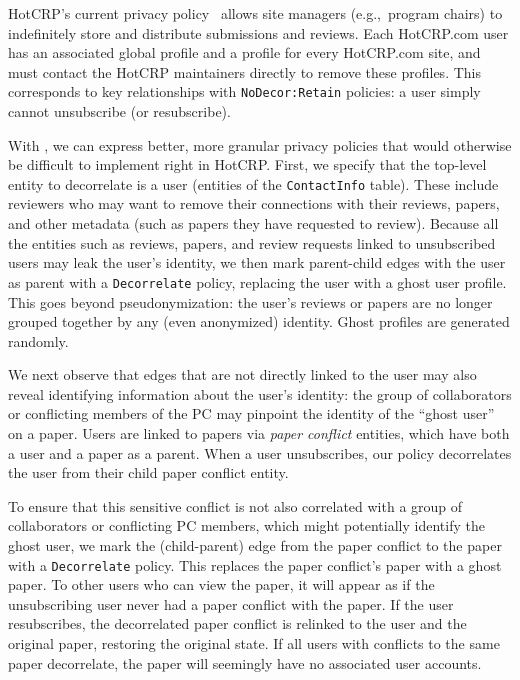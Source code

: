 HotCRP's current privacy policy~\cite{hotcrp:privacy} allows site managers (e.g.,\ program chairs)
to indefinitely store and distribute submissions and reviews. Each HotCRP.com user has an associated
global profile and a profile for every HotCRP.com site, and must contact the HotCRP maintainers
directly to remove these profiles. This corresponds to key relationships with
\texttt{NoDecor:Retain} policies: a user simply cannot unsubscribe (or resubscribe).

With \sys, we can express better, more granular privacy policies that would otherwise be difficult to
implement right in HotCRP. First, we specify that the top-level entity to decorrelate is a user
(entities of the \texttt{ContactInfo} table). These include reviewers who may want
to remove their connections with their reviews, papers, and other metadata (such as papers they
have requested to review).
Because all the entities such as reviews, papers, and review requests linked to unsubscribed users
may leak the user's identity, we then mark parent-child edges with the user as parent with a
\texttt{Decorrelate} policy, replacing the user with a ghost user profile. This goes beyond
pseudonymization: the user's reviews or papers are no longer grouped together by any (even anonymized)
identity. Ghost profiles are generated randomly.

We next observe that edges that are not directly linked to the user may also reveal identifying
information about the user's identity: the group of collaborators or conflicting members of the PC
may pinpoint the identity of the ``ghost user'' on a paper. Users are linked to papers via
\emph{paper conflict} entities, which have both a user and a paper as a parent. When a user
unsubscribes, our policy decorrelates the user from their child paper conflict entity. 

To ensure that this sensitive conflict is not also correlated with a group of collaborators or conflicting PC
members, which might potentially identify the ghost user, we mark the (child-parent) edge from
the paper conflict to the paper with a \texttt{Decorrelate} policy. This replaces the paper conflict's
paper with a ghost paper.
To other users who can view the paper, it will appear as if the unsubscribing
user never had a paper conflict with the paper.
If the user resubscribes, the decorrelated paper conflict is relinked to the user and the original
paper, restoring the original state.  If all users with conflicts to the same paper decorrelate, the
paper will seemingly have no associated user accounts.

